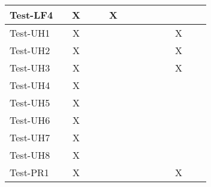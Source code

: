 \documentclass[12pt, titlepage]{article}
\begin{document}
\begin{table}[H]
\begin{adjustwidth}{-0.3in}{-0.5in}
{\begin{tabular}{c|c|c|c|c|c|c|c|c|c|c|c|c|c|}
\multicolumn{1}{|l|}{{Test-LF4}}   &             &         X    &             &             &     X        &             &             &             &              &              &                           &  &                    \\ \hline
\multicolumn{1}{|l|}{{Test-UH1}}   &             &        X     &             &             &             &             &             &             &              &              &                            X&  &                    \\ \hline
\multicolumn{1}{|l|}{{Test-UH2}}   &             &       X      &             &             &             &             &             &             &              &              &                           X&  &                    \\ \hline
\multicolumn{1}{|l|}{{Test-UH3}}   &             &      X       &             &             &             &             &             &             &              &              &                           X&   &                    \\ \hline
\multicolumn{1}{|l|}{{Test-UH4}}   &             &      X       &             &             &             &             &             &             &              &              &                           &  &                    \\ \hline
\multicolumn{1}{|l|}{{Test-UH5}}   &             &      X       &             &             &             &             &             &             &              &              &                           &  &                    \\ \hline
\multicolumn{1}{|l|}{{Test-UH6}}   &             &        X     &             &             &             &             &             &             &              &              &                           &  &                    \\ \hline
\multicolumn{1}{|l|}{{Test-UH7}}   &             &        X     &             &             &             &             &             &             &              &              &                           &  &                    \\ \hline
\multicolumn{1}{|l|}{{Test-UH8}}   &             &        X     &             &             &             &             &             &             &              &              &                           &  &                    \\ \hline
\multicolumn{1}{|l|}{{Test-PR1}}   &             &       X      &             &             &             &             &             &             &              &              &                     X      &  &                    \\ \hline

\end{tabular}}
\end{adjustwidth}
\end{table}
\end{document}
